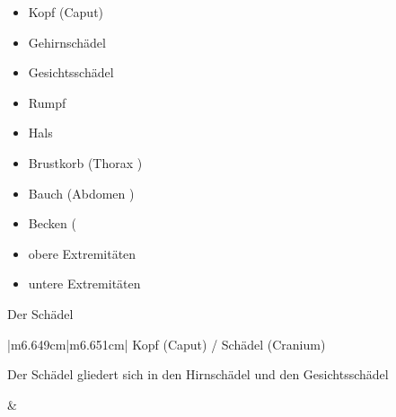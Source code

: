 \documentclass{article}
\makeatletter
\newcommand\captionof[1]{\def\@captype{#1}\caption}
\makeatother
\begin{document}
\begin{itemize}
\item Kopf  (Caput)

\end{itemize}
\begin{itemize}
\item Gehirnsch\"adel

\item Gesichtssch\"adel

\end{itemize}
\begin{itemize}
\item Rumpf  

\end{itemize}
\begin{itemize}
\item Hals 

\item Brustkorb (Thorax )

\item Bauch (Abdomen )

\item Becken (

\end{itemize}
\begin{itemize}
\item obere Extremit\"aten 

\item untere Extremit\"aten

\end{itemize}
Der Sch\"adel 

\begin{center}
\tablehead{}\begin{supertabular}{|m{6.649cm}|m{6.651cm}|}
\hline
Kopf (Caput) / Sch\"adel (Cranium)

Der Sch\"adel gliedert sich in den Hirnsch\"adel und den
Gesichtssch\"adel

\captionof{figure}[Hirnsch\"adel vs. Gesichts\-sch\"adel]{Hirnsch\"adel
vs. Gesichts\-sch\"adel}
 &
\par

\\\hline
\end{supertabular}
\end{center}
\end{document}
